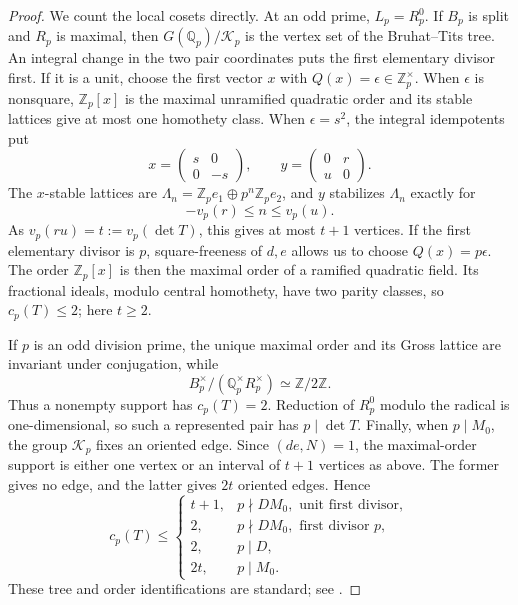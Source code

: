 \documentclass[11pt,reqno]{amsart}
\theoremstyle{definition}
\newcommand{\Q}{\mathbb Q}
\newcommand{\Z}{\mathbb Z}
\newcommand{\Kc}{\mathcal K}
\begin{document}
\begin{proof}
We count the local cosets directly.  At an odd prime, $L_p=R_p^0$.
If $B_p$ is split and $R_p$ is maximal, then $G(\Q_p)/\Kc_p$ is the
vertex set of the Bruhat--Tits tree.  An integral change in the two pair
coordinates puts the first elementary divisor first.  If it is a unit,
choose the first vector $x$ with $Q(x)=\epsilon\in\Z_p^\times$.  When
$\epsilon$ is nonsquare, $\Z_p[x]$ is the maximal unramified quadratic
order and its stable lattices give at most one homothety class.  When
$\epsilon=s^2$, the integral idempotents put
\[
 x=\begin{pmatrix}s&0\\0&-s\end{pmatrix},\qquad
 y=\begin{pmatrix}0&r\\u&0\end{pmatrix}.
\]
The $x$-stable lattices are
$\Lambda_n=\Z_pe_1\oplus p^n\Z_pe_2$, and $y$ stabilizes $\Lambda_n$
exactly for
\[
 -v_p(r)\leq n\leq v_p(u).
\]
As $v_p(ru)=t:=v_p(\det T)$, this gives at most $t+1$ vertices.
If the first elementary divisor is $p$, square-freeness of $d,e$ allows us
to choose $Q(x)=p\epsilon$.  The order $\Z_p[x]$ is then the maximal order
of a ramified quadratic field.  Its fractional ideals, modulo central
homothety, have two parity classes, so $c_p(T)\leq2$; here $t\geq2$.

If $p$ is an odd division prime, the unique maximal order and its Gross
lattice are invariant under conjugation, while
\[
 B_p^\times/(\Q_p^\times R_p^\times)\simeq\Z/2\Z.
\]
Thus a nonempty support has $c_p(T)=2$.  Reduction of $R_p^0$ modulo
the radical is one-dimensional, so such a represented pair has
$p\mid\det T$.  Finally, when $p\mid M_0$, the group $\Kc_p$ fixes an
oriented edge.  Since $(de,N)=1$, the maximal-order support is either one
vertex or an interval of $t+1$ vertices as above.  The former gives no
edge, and the latter gives $2t$ oriented edges.  Hence
\begin{equation}\label{eq:odd-local-counts}
 c_p(T)\leq
 \begin{cases}
  t+1,&p\nmid DM_0,\text{ unit first divisor},\\
  2,&p\nmid DM_0,\text{ first divisor }p,\\
  2,&p\mid D,\\
  2t,&p\mid M_0.
 \end{cases}
\end{equation}
These tree and order identifications are standard; see
\cite[Equation (23.2.4), Theorem 13.3.11, Lemma 23.5.15, and Sections
23.5.11--23.5.16]{Voight}.


\end{proof}
\end{document}
